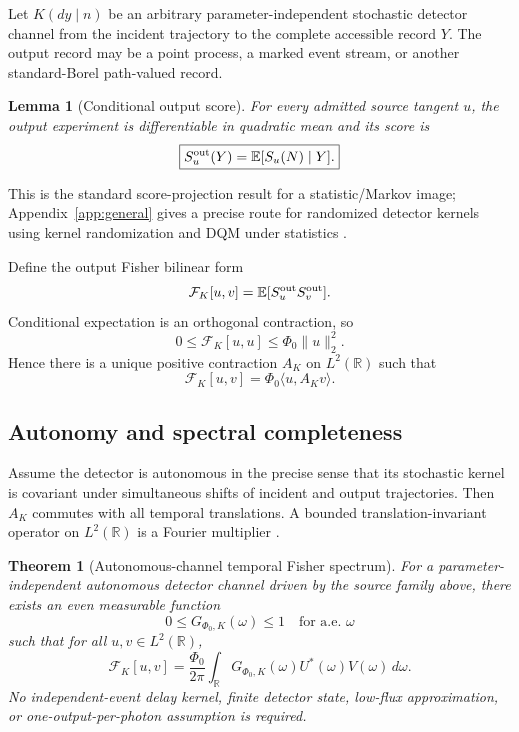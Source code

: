\documentclass[aps,prapplied,preprint,nofootinbib]{revtex4-2}
\newtheorem{theorem}{Theorem}
\newtheorem{lemma}{Lemma}
\newcommand{\E}{\mathbb E}
\newcommand{\R}{\mathbb R}
\begin{document}
Let $K(dy\mid n)$ be an arbitrary parameter-independent stochastic detector channel from the incident trajectory to the complete accessible record $Y$. The output record may be a point process, a marked event stream, or another standard-Borel path-valued record.

\begin{lemma}[Conditional output score]
For every admitted source tangent $u$, the output experiment is differentiable in quadratic mean and its score is
\begin{equation}
\boxed{
S_u^{\rm out}(Y)=\E[S_u(N)\mid Y].
}
\label{eq:conditionalScore}
\end{equation}
\end{lemma}

This is the standard score-projection result for a statistic/Markov image; Appendix~\ref{app:general} gives a precise route for randomized detector kernels using kernel randomization and DQM under statistics \cite{Kallenberg2021,Pollard2013}.

Define the output Fisher bilinear form
\begin{equation}
\mathcal F_K[u,v]=\E[S_u^{\rm out}S_v^{\rm out}].
\end{equation}
Conditional expectation is an orthogonal contraction, so
\begin{equation}
0\le \mathcal F_K[u,u]\le \Phi_0\|u\|_2^2.
\end{equation}
Hence there is a unique positive contraction $A_K$ on $L^2(\R)$ such that
\begin{equation}
\mathcal F_K[u,v]=\Phi_0\langle u,A_Kv\rangle.
\label{eq:AK}
\end{equation}

\subsection{Autonomy and spectral completeness}

Assume the detector is autonomous in the precise sense that its stochastic kernel is covariant under simultaneous shifts of incident and output trajectories. Then $A_K$ commutes with all temporal translations. A bounded translation-invariant operator on $L^2(\R)$ is a Fourier multiplier \cite{Stein1970}.

\begin{theorem}[Autonomous-channel temporal Fisher spectrum]
\label{thm:generalSpectrum}
For a parameter-independent autonomous detector channel driven by the source family above, there exists an even measurable function
\begin{equation}
0\le G_{\Phi_0,K}(\omega)\le1
\quad\text{for a.e. }\omega
\end{equation}
such that for all $u,v\in L^2(\R)$,
\begin{equation}
\boxed{
\mathcal F_K[u,v]
=\frac{\Phi_0}{2\pi}
\int_{\R}G_{\Phi_0,K}(\omega)
U^*(\omega)V(\omega)\,d\omega.
}
\label{eq:generalSpectrum}
\end{equation}
No independent-event delay kernel, finite detector state, low-flux approximation, or one-output-per-photon assumption is required.
\end{theorem}
\end{document}
